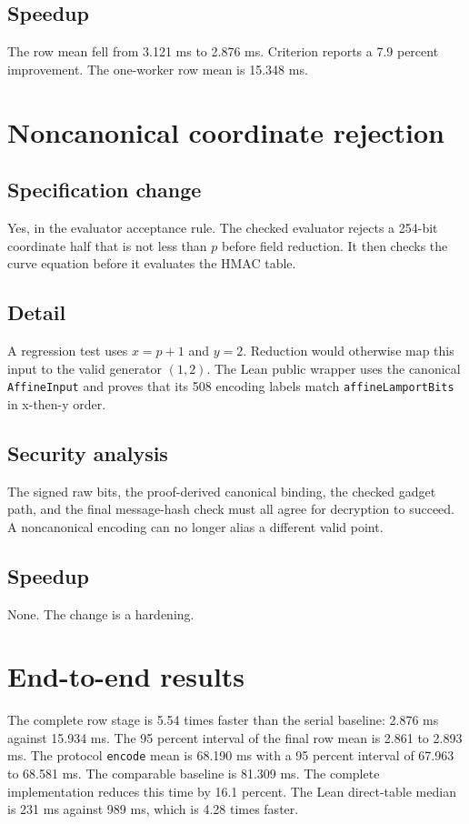 \documentclass[10pt]{article}
\begin{document}
\subsection{Speedup}
The row mean fell from 3.121 ms to 2.876 ms.
Criterion reports a 7.9 percent improvement.
The one-worker row mean is 15.348 ms.

\section{Noncanonical coordinate rejection}
\label{sec:o12}

\subsection{Specification change}
Yes, in the evaluator acceptance rule.
The checked evaluator rejects a 254-bit coordinate half that is not less than $p$ before field reduction.
It then checks the curve equation before it evaluates the HMAC table.

\subsection{Detail}
A regression test uses $x=p+1$ and $y=2$.
Reduction would otherwise map this input to the valid generator $(1,2)$.
The Lean public wrapper uses the canonical \texttt{AffineInput} and proves that its 508 encoding labels match \texttt{affineLamportBits} in x-then-y order.

\subsection{Security analysis}
The signed raw bits, the proof-derived canonical binding, the checked gadget path, and the final message-hash check must all agree for decryption to succeed.
A noncanonical encoding can no longer alias a different valid point.

\subsection{Speedup}
None.
The change is a hardening.

\section{End-to-end results}

The complete row stage is 5.54 times faster than the serial baseline: 2.876 ms against 15.934 ms.
The 95 percent interval of the final row mean is 2.861 to 2.893 ms.
The protocol \texttt{encode} mean is 68.190 ms with a 95 percent interval of 67.963 to 68.581 ms.
The comparable baseline is 81.309 ms.
The complete implementation reduces this time by 16.1 percent.
The Lean direct-table median is 231 ms against 989 ms, which is 4.28 times faster.
\end{document}
